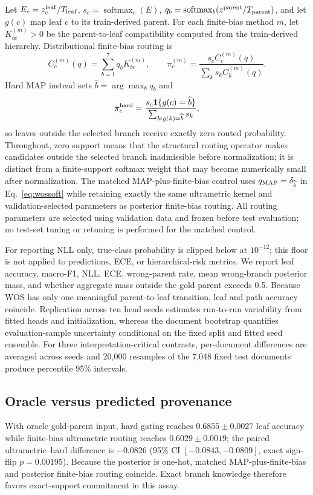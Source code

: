 \documentclass[preprint,11pt]{elsarticle}
\begin{document}
Let $E_c=z_c^{\rm leaf}/T_{\rm leaf}$, $s_c=\operatorname{softmax}_c(E)$, $q_b=\operatorname{softmax}_b(z^{\rm parent}/T_{\rm parent})$, and let $g(c)$ map leaf $c$ to its train-derived parent. For each finite-bias method $m$, let $K^{(m)}_{bc}>0$ be the parent-to-leaf compatibility computed from the train-derived hierarchy. Distributional finite-bias routing is
\begin{equation}
 C_c^{(m)}(q)=\sum_{b=1}^{7}q_bK^{(m)}_{bc},\qquad
 \pi_c^{(m)}=\frac{s_cC_c^{(m)}(q)}{\sum_k s_kC_k^{(m)}(q)}.
 \label{eq:wossoft}
\end{equation}
Hard MAP instead sets $\widehat b=\arg\max_b q_b$ and
\begin{equation}
 \pi_c^{\rm hard}=\frac{s_c\mathbf 1\{g(c)=\widehat b\}}{\sum_{k:g(k)=\widehat b}s_k},
 \label{eq:woshard}
\end{equation}
so leaves outside the selected branch receive exactly zero routed probability. Throughout, zero support means that the structural routing operator makes candidates outside the selected branch inadmissible before normalization; it is distinct from a finite-support softmax weight that may become numerically small after normalization. The matched MAP-plus-finite-bias control uses $q_{\rm MAP}=\delta_{\widehat b}$ in Eq.~\eqref{eq:wossoft} while retaining exactly the same ultrametric kernel and validation-selected parameters as posterior finite-bias routing. All routing parameters are selected using validation data and frozen before test evaluation; no test-set tuning or retuning is performed for the matched control.

For reporting NLL only, true-class probability is clipped below at $10^{-12}$; this floor is not applied to predictions, ECE, or hierarchical-risk metrics. We report leaf accuracy, macro-F1, NLL, ECE, wrong-parent rate, mean wrong-branch posterior mass, and whether aggregate mass outside the gold parent exceeds 0.5. Because WOS has only one meaningful parent-to-leaf transition, leaf and path accuracy coincide. Replication across ten head seeds estimates run-to-run variability from fitted heads and initialization, whereas the document bootstrap quantifies evaluation-sample uncertainty conditional on the fixed split and fitted seed ensemble. For three interpretation-critical contrasts, per-document differences are averaged across seeds and 20,000 resamples of the 7,048 fixed test documents produce percentile 95\% intervals.

\subsection{Oracle versus predicted provenance}
With oracle gold-parent input, hard gating reaches $0.6855\pm0.0027$ leaf accuracy while finite-bias ultrametric routing reaches $0.6029\pm0.0019$; the paired ultrametric--hard difference is $-0.0826$ (95\% CI $[-0.0843,-0.0809]$, exact sign-flip $p=0.00195$). Because the posterior is one-hot, matched MAP-plus-finite-bias and posterior finite-bias routing coincide. Exact branch knowledge therefore favors exact-support commitment in this assay.
\end{document}
